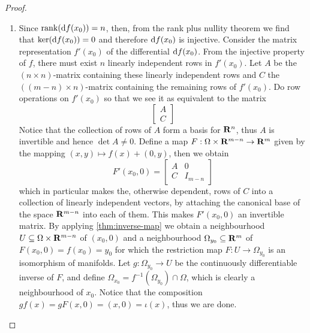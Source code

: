 \begin{proof}
    \begin{enumerate}\setlength\itemsep{0em}
        \item Since \(\operatorname{rank}(\mathrm{d} f(x_0)) = n\), then, from the rank plus nullity
              theorem we find that \(\ker (\mathrm{d} f(x_0)) = 0\) and therefore \(\mathrm{d}
              f(x_{0})\) is injective. Consider the matrix representation \(f'(x_0)\)
              of the differential \(\mathrm{d} f(x_0)\). From the injective property of
              \(f\), there must exist \(n\) linearly independent rows in
              \(f'(x_0)\). Let \(A\) be the \((n \times n)\)-matrix containing these linearly
              independent rows and \(C\) the \(((m - n) \times n)\)-matrix containing the
              remaining rows of \(f'(x_0)\). Do row operations on \(f'(x_0)\) so that we
              see it as equivalent to the matrix
              \[
                  \begin{bmatrix}
                      A \\ C
                  \end{bmatrix}
              \]
              Notice that the collection of rows of \(A\) form a basis for \(\mathbf{R}^n\),
              thus \(A\) is invertible and hence \(\det A \neq 0\). Define a map \(F: \Omega \times
              \mathbf{R}^{m-n} \to \mathbf{R}^m\) given by the mapping \((x, y) \mapsto f(x) + (0, y)\), then we
              obtain
              \[
                  F'(x_0, 0) =
                  \begin{bmatrix}
                      A & 0 \\ C &I_{m - n}
                  \end{bmatrix}
              \]
              which in particular makes the, otherwise dependent, rows of \(C\) into a
              collection of linearly independent vectors, by attaching the canonical
              base of the space \(\mathbf{R}^{m-n}\) into each of them. This makes \(F'(x_0,
              0)\) an invertible matrix. By applying \cref{thm:inverse-map} we obtain a
              neighbourhood \(U \subseteq \Omega \times \mathbf{R}^{m-n}\) of \((x_0, 0)\) and a neighbourhood
              \(\Omega_{y_0} \subseteq \mathbf{R}^m\) of \(F(x_0, 0) = f(x_{0}) = y_0\) for which the
              restriction map \(F: U \to \Omega_{y_0}\) is an isomorphism of manifolds. Let \(g:
              \Omega_{y_0} \to U\) be the continuously differentiable inverse of \(F\), and
              define \(\Omega_{x_0} = f^{-1}(\Omega_{y_0}) \cap \Omega\), which is clearly a neighbourhood
              of \(x_0\). Notice that the composition \(g f(x) = g F (x, 0) = (x, 0) =
              \iota(x)\), thus we are done.


\end{enumerate}
\end{proof}
